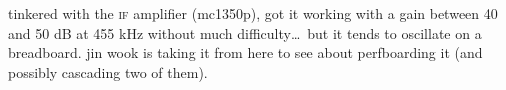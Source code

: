 tinkered with the \textsc{if} amplifier (mc1350p), got it working with a gain
between 40 and 50 dB at 455 kHz without much difficulty\dots\ but it tends to
oscillate on a breadboard. jin wook is taking it from here to see about
perfboarding it (and possibly cascading two of them).
